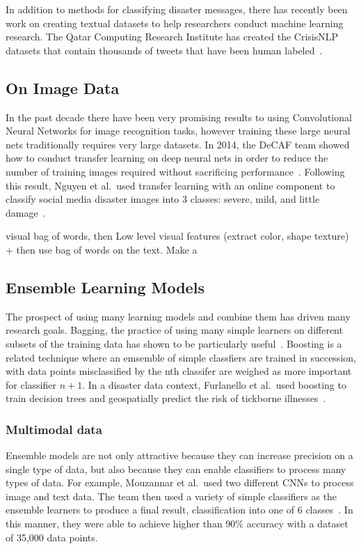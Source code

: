 In addition to methods for classifying disaster messages, there has recently been work 
on creating textual datasets to help researchers conduct machine learning research. 
The Qatar Computing Research Institute has created the CrisisNLP datasets that 
contain thousands of tweets that have been human labeled~\cite{nguyenRapidClassificationCrisisRelated}.

\subsection{On Image Data}
In the past decade there have been very promising results to using Convolutional Neural Networks
for image recognition tasks, however training these large neural nets traditionally
requires very large datasets. In 2014, the DeCAF team showed how to conduct 
transfer learning on deep neural nets in order to reduce the number of 
training images required without sacrificing performance~\cite{donahueDeCAFDeepConvolutional2013}.
Following this result, Nguyen et al.\ used transfer learning with an online component 
to classify social media disaster images into 3 classes: severe, mild, and little
damage~\cite{nguyenDamageAssessmentSocial2017}. 

  visual bag of words, then Low level visual features (extract color, shape texture) + then use bag of words
  on the text. Make a~\cite{jomaaSemanticVisualCues2016}

\subsection{Ensemble Learning Models}
  The prospect of using many learning models and combine them has driven many 
  research goals. Bagging, the practice of using many simple learners on
  different subsets of the training data has shown to be particularly
  useful~\cite{breimanBaggingPredictors1996}.  Boosting is a related technique
  where an emsemble of simple classfiers are trained in succession, with
  data points misclassified by the nth classifer are weighed as more important
  for classifier $n+1$. In a disaster data context, Furlanello et al.\ used
  boosting to train decision trees and geospatially predict the risk of
  tickborne illnesses~\cite{furlanelloBoostingTreeBasedClassifiers2000}.
  
  
  \subsubsection{Multimodal data} 
  Ensemble models are not only attractive because they can increase precision on a
  single type of data, but also because they can enable classifiers to process
  many types of data. For example, Mouzannar et al.\ used two different CNNs to 
  process image and text data. The team then used a variety of simple classifiers 
  as the ensemble learners to produce a final result,
  classification into one of 6 classes~\cite{mouzannarDamageIdentificationSocial2018}.
  In this manner, they were able to achieve higher than 90\% accuracy with a dataset of 
  35,000 data points.

